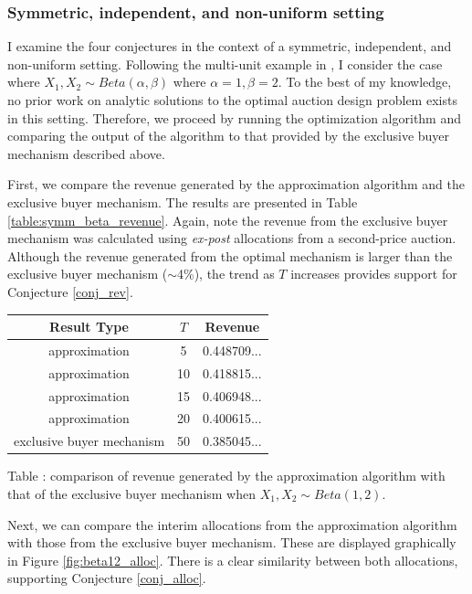 \documentclass{article}
\newcounter{fig}
\begin{document}
\subsubsection{Symmetric, independent, and non-uniform setting}

I examine the four conjectures in the context of a symmetric, independent, and non-uniform setting. Following the multi-unit example in \autocite{daskalakis2017strong}, I consider the case where $X_1,X_2 \sim Beta(\alpha,\beta)$ where $\alpha=1,\beta=2$. To the best of my knowledge, no prior work on analytic solutions to the optimal auction design problem exists in this setting. Therefore, we proceed by running the optimization algorithm and comparing the output of the algorithm to that provided by the exclusive buyer mechanism described above.

First, we compare the revenue generated by the approximation algorithm and the exclusive buyer mechanism. The results are presented in Table \ref{table:symm_beta_revenue}. Again, note the revenue from the exclusive buyer mechanism was calculated using \textit{ex-post} allocations from a second-price auction. Although the revenue generated from the optimal mechanism is larger than the exclusive buyer mechanism ($\sim$4\%), the trend as $T$ increases provides support for Conjecture \ref{conj_rev}.

\begin{center}
    \begin{tabular}{ |c|c|c| } 
    \hline
    Result Type & $T$ & Revenue \\
    \hline
    \hline
    approximation & 5 & 0.448709... \\ 
    approximation & 10 & 0.418815... \\ 
    approximation & 15 & 0.406948... \\ 
    approximation & 20 & 0.400615... \\ 
    exclusive buyer mechanism & 50 & 0.385045... \\
    \hline
    \end{tabular}

    \vspace{1mm}
    \raggedright{\small {\sc Table \thefig\label{table:symm_beta_revenue}:} comparison of revenue generated by the approximation algorithm with that of the exclusive buyer mechanism when $X_1,X_2 \sim Beta(1,2)$.}
\end{center}

Next, we can compare the interim allocations from the approximation algorithm with those from the exclusive buyer mechanism. These are displayed graphically in Figure \ref{fig:beta12_alloc}. There is a clear similarity between both allocations, supporting Conjecture \ref{conj_alloc}.
\end{document}
